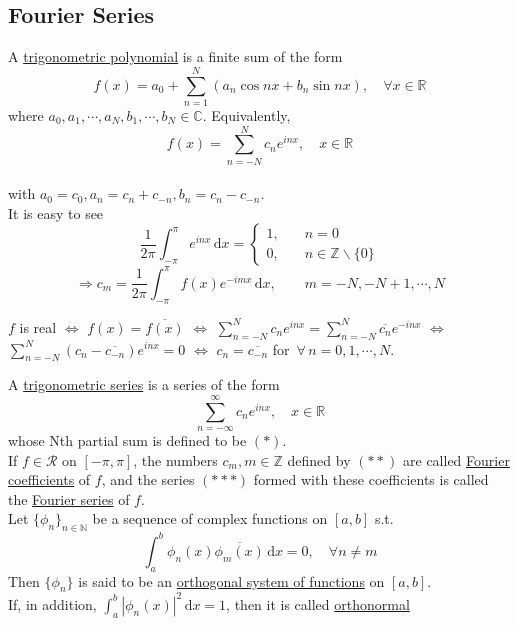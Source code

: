 \subsection{Fourier Series}
 A \underline{trigonometric polynomial} is a finite sum of the form 
 \[f(x)=a_0+\sum\limits_{n=1}^{N}(a_n\cos{nx}+b_n \sin{nx}), \quad\forall x\in\mathbb{R} \]
 where  $ a_0,a_1,\cdots, a_N,b_1,\cdots,b_N\in \mathbb{C} $. Equivalently,
\begin{equation}
    f(x)=\sum\limits_{n=-N }^{N } c_ne^{inx},\quad x\in \mathbb{R }\tag{ $ \ast $ }
\end{equation}\\
with  $ a_0=c_0,a_n=c_n+c_{-n},b_n=c_n-c_{-n} $.\\
It is easy to see 
\begin{equation*}
    \frac{1}{2\pi}\int_{-\pi }^{\pi } e^{inx}\, \mathrm{d}x=\left\{
        \begin{aligned}
            1,&\quad n=0\\
            0,&\quad n\in \mathbb{Z }\backslash\{0\}
        \end{aligned}
    \right.  
\end{equation*}
\begin{equation}
    \Rightarrow c_m =\frac{1}{2\pi }\int_{-\pi }^{\pi } f(x)e^{-imx}\, \mathrm{d}x, \qquad m=-N,-N+1,\cdots , N\tag{ $ \ast\ast $ }
\end{equation} 
\begin{remark}
     $ f  $ is real  $ \Leftrightarrow  $  $ f(x)=\overline{f(x)}  $ $ \Leftrightarrow $  $ \sum\limits_{n=-N }^{N } c_ne^{inx} =\sum\limits_{n=-N }^{N } \overline{c_n}e^{-inx}$   $ \Leftrightarrow $  $ \sum\limits_{n=-N }^{N } (c_n-\overline{c_{-n}})e^{inx}=0 $  $ \Leftrightarrow $  $ c_n=\overline{c_{-n}} $  for  $ \,\forall \,n=0,1,\cdots ,N  $.  
\end{remark}
A \underline{trigonometric series} is  a series of the form 
\begin{equation}
    \sum\limits_{n=-\infty}^{\infty}c_ne^{inx} ,\quad x\in \mathbb{R }\tag{ $ \ast\ast\ast $ }
\end{equation}
whose Nth partial sum is defined to be  $ (\ast) $.\\
If  $ f\in \mathscr{R } $ on  $ [-\pi,\pi ] $, the numbers  $ c_m,m\in\mathbb{Z } $ defined by  $ (\ast\ast) $ are called \underline{Fourier coefficients} of  $ f  $, and the series  $ (\ast\ast\ast) $ formed with these coefficients is called the \underline{Fourier series} of  $ f $.\\
Let  $ \{\phi_n\}_{n\in\mathbb{N }} $ be a sequence of complex functions on  $ [a,b] $ s.t.
\[\int_{a }^{b } \phi_n(x)\overline{\phi_m(x)}\, \mathrm{d}x=0,\quad\forall n\not=m  \]
Then  $ \{\phi_n \} $ is said to be an \underline{orthogonal system of functions} on  $ [a,b] $.\\
If, in addition,  $ \int_{a }^{b } |\phi_n(x)|^2\, \mathrm{d}x=1   $, then it is called \underline{orthonormal}\\

